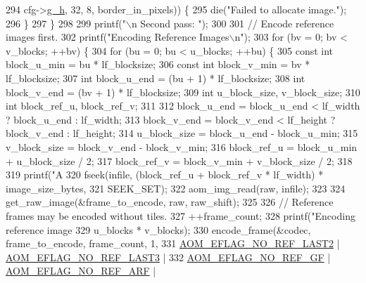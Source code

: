 \begin{DoxyCodeInclude}
{{{{{294                                    cfg->\hyperlink{structaom__codec__enc__cfg_a37b0f57b63bec8d133df8901d4407ee6}{g\_h}, 32, 8, border\_in\_pixels)) \{
295       die(\textcolor{stringliteral}{"Failed to allocate image."});
296     \}
297   \}
298 
299   printf(\textcolor{stringliteral}{"\(\backslash\)n Second pass: "});
300 
301   \textcolor{comment}{// Encode reference images first.}
302   printf(\textcolor{stringliteral}{"Encoding Reference Images\(\backslash\)n"});
303   \textcolor{keywordflow}{for} (bv = 0; bv < v\_blocks; ++bv) \{
304     \textcolor{keywordflow}{for} (bu = 0; bu < u\_blocks; ++bu) \{
305       \textcolor{keyword}{const} \textcolor{keywordtype}{int} block\_u\_min = bu * lf\_blocksize;
306       \textcolor{keyword}{const} \textcolor{keywordtype}{int} block\_v\_min = bv * lf\_blocksize;
307       \textcolor{keywordtype}{int} block\_u\_end = (bu + 1) * lf\_blocksize;
308       \textcolor{keywordtype}{int} block\_v\_end = (bv + 1) * lf\_blocksize;
309       \textcolor{keywordtype}{int} u\_block\_size, v\_block\_size;
310       \textcolor{keywordtype}{int} block\_ref\_u, block\_ref\_v;
311 
312       block\_u\_end = block\_u\_end < lf\_width ? block\_u\_end : lf\_width;
313       block\_v\_end = block\_v\_end < lf\_height ? block\_v\_end : lf\_height;
314       u\_block\_size = block\_u\_end - block\_u\_min;
315       v\_block\_size = block\_v\_end - block\_v\_min;
316       block\_ref\_u = block\_u\_min + u\_block\_size / 2;
317       block\_ref\_v = block\_v\_min + v\_block\_size / 2;
318 
319       printf(\textcolor{stringliteral}{"A%
320       fseek(infile, (block\_ref\_u + block\_ref\_v * lf\_width) * image\_size\_bytes,
321             SEEK\_SET);
322       aom\_img\_read(raw, infile);
323 
324       get\_raw\_image(&frame\_to\_encode, raw, raw\_shift);
325 
326       \textcolor{comment}{// Reference frames may be encoded without tiles.}
327       ++frame\_count;
328       printf(\textcolor{stringliteral}{"Encoding reference image %
329              u\_blocks * v\_blocks);
330       encode\_frame(&codec, frame\_to\_encode, frame\_count, 1,
331                    \hyperlink{group__aom__encoder_ga50c2560ca6670298cfc614ecae96a391}{AOM\_EFLAG\_NO\_REF\_LAST2} | 
      \hyperlink{group__aom__encoder_gaa4bc8ae2b977b73f0ef57ba428ca1d2c}{AOM\_EFLAG\_NO\_REF\_LAST3} |
332                        \hyperlink{group__aom__encoder_gaaef6fe76991abf87edd2f296eee999f8}{AOM\_EFLAG\_NO\_REF\_GF} | 
      \hyperlink{group__aom__encoder_ga9e2f989737d63ddf4e987a525d186a46}{AOM\_EFLAG\_NO\_REF\_ARF} |
}}}}}}}
\end{DoxyCodeInclude}

